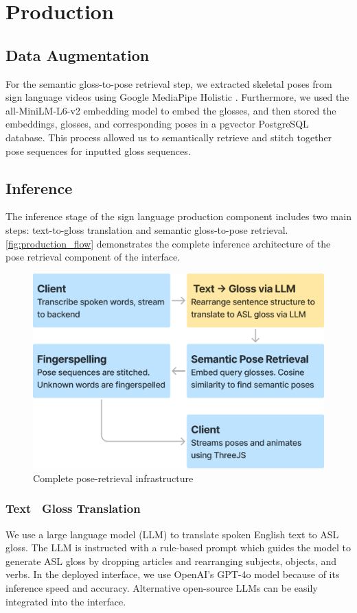 \documentclass[../paper.tex]{subfiles}
\begin{document}
\section{Production}
\label{sec:production}

\subsection{Data Augmentation}
For the semantic gloss-to-pose retrieval step, we extracted skeletal poses from sign language videos using Google MediaPipe Holistic \cite{MediaPipe}. Furthermore, we used the all-MiniLM-L6-v2 embedding model \cite{minilm} to embed the glosses, and then stored the embeddings, glosses, and corresponding poses in a pgvector PostgreSQL database. This process allowed us to semantically retrieve and stitch together pose sequences for inputted gloss sequences.

\subsection{Inference}
The inference stage of the sign language production component includes two main steps: text-to-gloss translation and semantic gloss-to-pose retrieval. \autoref{fig:production_flow} demonstrates the complete inference architecture of the pose retrieval component of the interface.

\begin{figure}[!htbp]
  \centerline{\includegraphics[width=\linewidth]{../figures/production-flow.png}}
  \caption{Complete pose-retrieval infrastructure}\label{fig:production_flow}
\end{figure}

\subsubsection*{Text \textrightarrow\ Gloss Translation} We use a large language model (LLM) to translate spoken English text to ASL gloss. The LLM is instructed with a rule-based prompt which guides the model to generate ASL gloss by dropping articles and rearranging subjects, objects, and verbs. In the deployed interface, we use OpenAI's GPT-4o \cite{gpt4o} model because of its inference speed and accuracy. Alternative open-source LLMs can be easily integrated into the interface.
\end{document}
